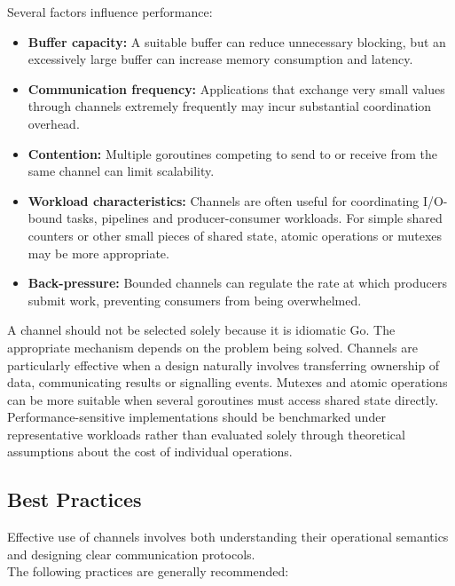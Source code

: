 Several factors influence performance:

\begin{itemize}
    \item \textbf{Buffer capacity:} A suitable buffer can reduce unnecessary blocking, but an excessively large buffer can increase memory consumption and latency.
    \item \textbf{Communication frequency:} Applications that exchange very small values through channels extremely frequently may incur substantial coordination overhead.
    \item \textbf{Contention:} Multiple goroutines competing to send to or receive from the same channel can limit scalability.
    \item \textbf{Workload characteristics:} Channels are often useful for coordinating I/O-bound tasks, pipelines and producer-consumer workloads. For simple shared counters or other small pieces of shared state, atomic operations or mutexes may be more appropriate.
    \item \textbf{Back-pressure:} Bounded channels can regulate the rate at which producers submit work, preventing consumers from being overwhelmed.
\end{itemize}

A channel should not be selected solely because it is idiomatic Go. The appropriate mechanism depends on the problem being solved. Channels are particularly effective when a design naturally involves transferring ownership of data, communicating results or signalling events. Mutexes and atomic operations can be more suitable when several goroutines must access shared state directly.\\

Performance-sensitive implementations should be benchmarked under representative workloads rather than evaluated solely through theoretical assumptions about the cost of individual operations.

\subsection{Best Practices}

Effective use of channels involves both understanding their operational semantics and designing clear communication protocols.\\

The following practices are generally recommended:

